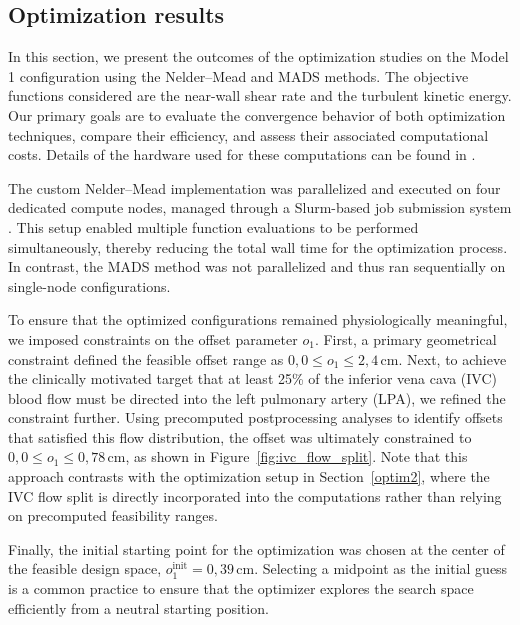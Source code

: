 \newpage
\subsection{Optimization results}  
In this section, we present the outcomes of the optimization studies on the Model 1 configuration using the Nelder--Mead and MADS methods. The objective functions considered are the near-wall shear rate and the turbulent kinetic energy. Our primary goals are to evaluate the convergence behavior of both optimization techniques, compare their efficiency, and assess their associated computational costs. Details of the hardware used for these computations can be found in \cite{gpu}.

The custom Nelder--Mead implementation was parallelized and executed on four dedicated compute nodes, managed through a Slurm-based job submission system \cite{slurm}. This setup enabled multiple function evaluations to be performed simultaneously, thereby reducing the total wall time for the optimization process. In contrast, the MADS method was not parallelized and thus ran sequentially on single-node configurations.

To ensure that the optimized configurations remained physiologically meaningful, we imposed constraints on the offset parameter \(o_1\). First, a primary geometrical constraint defined the feasible offset range as \(0{,}0 \leq o_1 \leq 2{,}4\,\text{cm}\). Next, to achieve the clinically motivated target that at least 25\% of the inferior vena cava (IVC) blood flow must be directed into the left pulmonary artery (LPA), we refined the constraint further. Using precomputed postprocessing analyses to identify offsets that satisfied this flow distribution, the offset was ultimately constrained to \(0{,}0 \leq o_1 \leq 0{,}78\,\text{cm}\), as shown in Figure~\ref{fig:ivc_flow_split}. Note that this approach contrasts with the optimization setup in Section~\ref{optim2}, where the IVC flow split is directly incorporated into the computations rather than relying on precomputed feasibility ranges.

Finally, the initial starting point for the optimization was chosen at the center of the feasible design space, \(o_1^\text{init} = 0{,}39\,\text{cm}\). Selecting a midpoint as the initial guess is a common practice to ensure that the optimizer explores the search space efficiently from a neutral starting position.


